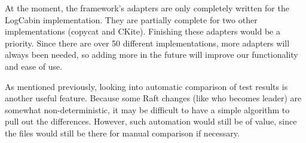 \documentclass[UTF8]{article}
\begin{document}
At the moment, the framework's adapters are only completely written for the LogCabin implementation. They are partially complete for two other implementations (copycat and CKite). Finishing these adapters would be a priority. Since there are over 50 different implementations, more adapters will always been needed, so adding more in the future will improve our functionality and ease of use.

As mentioned previously, looking into automatic comparison of test results is another useful feature. Because some Raft changes (like who becomes leader) are somewhat non-deterministic, it may be difficult to have a simple algorithm to pull out the differences. However, such automation would still be of value, since the files would still be there for manual comparison if necessary.





\end{document}
